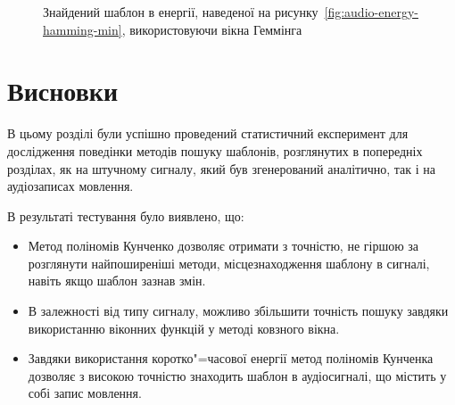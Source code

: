 \begin{figure}[h]

            \caption{Знайдений шаблон в енергії, наведеної на рисунку~\ref{fig:audio-energy-hamming-min},
                використовуючи вікна Геммінга}
            \label{fig:matched-energy-hamming-min-hamming}
        \end{figure}

        \clearpage

\section{Висновки}
    В цьому розділі були успішно проведений статистичний експеримент для дослідження поведінки методів пошуку
    шаблонів, розглянутих в попередніх розділах, як на штучному сигналу, який був згенерований аналітично, так і на
    аудіозаписах мовлення.

    В результаті тестування було виявлено, що:
    \begin{itemize}
        \item Метод поліномів Кунченко дозволяє отримати з точністю, не гіршою за розглянути найпоширеніші методи,
            місцезнаходження шаблону в сигналі, навіть якщо шаблон зазнав змін.
        \item В залежності від типу сигналу, можливо збільшити точність пошуку завдяки використанню віконних функцій у
            методі ковзного вікна.
        \item Завдяки використання коротко"=часової енергії метод поліномів Кунченка дозволяє з високою точністю
            знаходить шаблон в аудіосигналі, що містить у собі запис мовлення.
    \end{itemize}

